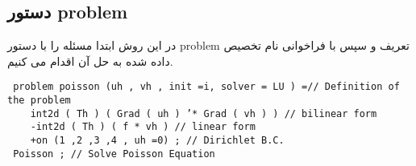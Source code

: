 \subsection{دستور problem}
در این روش ابتدا مسئله را با دستور problem تعریف و سپس با فراخوانی نام تخصیص داده شده به حل آن اقدام می کنیم.
\begin{LTR}
	\begin{lstlisting}
 problem poisson (uh , vh , init =i, solver = LU ) =// Definition of the problem
	int2d ( Th ) ( Grad ( uh ) ’* Grad ( vh ) ) // bilinear form
	-int2d ( Th ) ( f * vh ) // linear form
	+on (1 ,2 ,3 ,4 , uh =0) ; // Dirichlet B.C.
 Poisson ; // Solve Poisson Equation
	\end{lstlisting}
\end{LTR}

